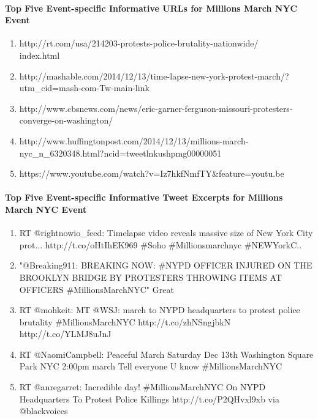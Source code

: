\paragraph{Top Five Event-specific Informative URLs for Millions March NYC Event}
\begin{enumerate}
\item http://rt.com/usa/214203-protests-police-brutality-nationwide/\\index.html
\item http://mashable.com/2014/12/13/time-lapse-new-york-protest-march/?utm\_cid=mash-com-Tw-main-link
\item http://www.cbsnews.com/news/eric-garner-ferguson-missouri-protesters-converge-on-washington/
\item http://www.huffingtonpost.com/2014/12/13/millions-march-nyc\_n\_6320348.html?ncid=tweetlnkushpmg00000051 
\item https://www.youtube.com/watch?v=Iz7hkfNmfTY\&feature=youtu.be                                                                                                                                                                                                                                                                                                                                                                                                                                                                                           
\end{enumerate}

\paragraph{Top Five Event-specific Informative Tweet Excerpts for Millions March NYC Event}
\begin{enumerate}
\item RT @rightnowio\_feed: Timelapse video reveals massive size of New York City prot... http://t.co/oHtIhEK969 \#Soho \#Millionsmarchnyc \#NEWYorkC..
\item "@Breaking911: BREAKING NOW: \#NYPD OFFICER INJURED ON THE BROOKLYN BRIDGE BY PROTESTERS THROWING ITEMS AT OFFICERS \#MillionsMarchNYC" Great
\item RT @mohkeit: MT @WSJ: march to NYPD headquarters to protest police brutality \#MillionsMarchNYC http://t.co/zhNSngjbkN http://t.co/YLMJ8uJnJ
\item RT @NaomiCampbell: Peaceful March Saturday Dec 13th Washington Square Park NYC 2:00pm march   Tell everyone U know \#MillionsMarchNYC
\item RT @anregarret: Incredible day! \#MillionsMarchNYC On NYPD Headquarters To Protest Police Killings http://t.co/P2QHvxl9xb via @blackvoices \end{enumerate}

